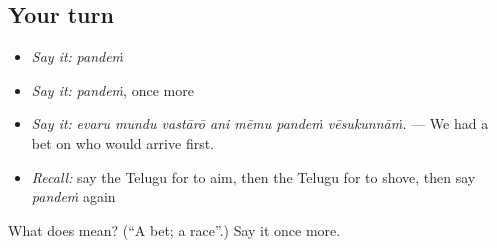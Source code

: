 \subsection*{Your turn}
\begin{itemize}
\raggedright
  \item \emph{Say it:} \emph{pandeṁ}
  \item \emph{Say it:} \emph{pandeṁ}, once more
  \item \emph{Say it:} \emph{evaru mundu vastārō ani mēmu pandeṁ vēsukunnāṁ.} — We had a bet on who would arrive first.
  \item \emph{Recall:} say the Telugu for to aim, then the Telugu for to shove, then say \emph{pandeṁ} again
\end{itemize}

\begin{tcolorbox}[breakable,colback=teal!4,colframe=teal!35!black,title={Before you move on}]
What does  mean? (\textquotedblleft{}A bet; a race\textquotedblright{}.) Say it once more.
\end{tcolorbox}
